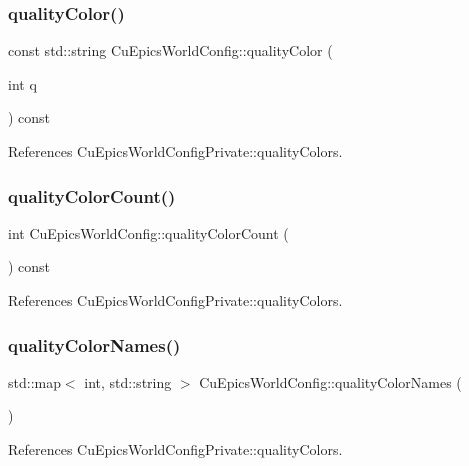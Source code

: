 \subsubsection{quality\+Color()}
{\footnotesize\ttfamily const std\+::string Cu\+Epics\+World\+Config\+::quality\+Color (\begin{DoxyParamCaption}\item[{int}]{q }\end{DoxyParamCaption}) const}



References Cu\+Epics\+World\+Config\+Private\+::quality\+Colors.

\mbox{\label{classCuEpicsWorldConfig_a10bead8731bb4ec1fff322922699ddf0}} 
\subsubsection{quality\+Color\+Count()}
{\footnotesize\ttfamily int Cu\+Epics\+World\+Config\+::quality\+Color\+Count (\begin{DoxyParamCaption}{ }\end{DoxyParamCaption}) const}



References Cu\+Epics\+World\+Config\+Private\+::quality\+Colors.

\mbox{\label{classCuEpicsWorldConfig_a27eb5ad034e1bc4f82fe722ae32c3005}} 
\subsubsection{quality\+Color\+Names()}
{\footnotesize\ttfamily std\+::map$<$ int, std\+::string $>$ Cu\+Epics\+World\+Config\+::quality\+Color\+Names (\begin{DoxyParamCaption}{ }\end{DoxyParamCaption})}



References Cu\+Epics\+World\+Config\+Private\+::quality\+Colors.

\mbox{\label{classCuEpicsWorldConfig_abe2beb55c16abf12f7b010702576979b}} 
